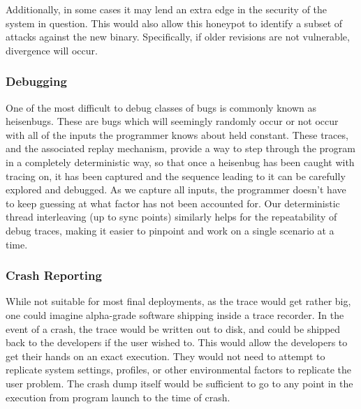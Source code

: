 Additionally, in some cases it may lend an extra edge in the security of
the system in question. This would also allow this honeypot to identify a subset of
attacks against the new binary. Specifically, if older revisions are
not vulnerable, divergence will occur.
\subsubsection{Debugging}
One of the most difficult to debug classes of bugs is commonly known as
heisenbugs. These are bugs which will seemingly randomly occur or not
occur with all of the inputs the programmer knows about held constant.
These traces, and the associated replay mechanism, provide a way to step
through the program in a completely deterministic way, so that once
a heisenbug has been caught with tracing on, it has been captured and
the sequence leading to it can be carefully explored and debugged.
As we capture all inputs, the programmer doesn't have to keep guessing
at what factor has not been accounted for. Our deterministic thread
interleaving (up to sync points) similarly helps for the repeatability
of debug traces, making it easier to pinpoint and work on a single
scenario at a time.
\subsubsection{Crash Reporting}
While not suitable for most final deployments, as the trace would get
rather big, one could imagine alpha-grade software shipping inside a
trace recorder. In the event of a crash, the trace would be written out
to disk, and could be shipped back to the developers if the user wished
to. This would allow the developers to get their hands on an exact
execution. They would not need to attempt to replicate system settings,
profiles, or other environmental factors to replicate the user problem.
The crash dump itself would be sufficient to go to any point in the
execution from program launch to the time of crash.
